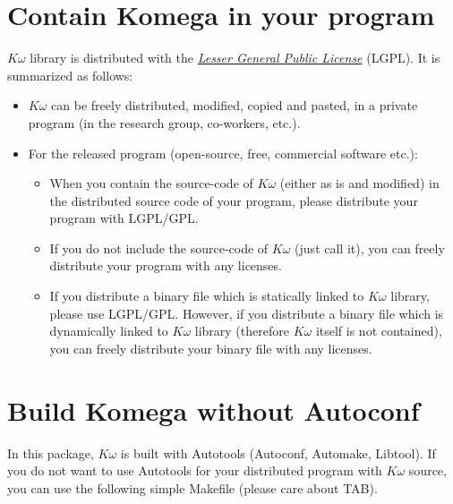 \documentclass[letterpaper,10pt,dvipdfmx,openany]{sphinxmanual}
\begin{document}
\section{Contain Komega in your program}
\label{komega_copyright_en:contain-komega-in-your-program}
\(K\omega\) library is distributed with the {\hyperref[komega_copyright_en:lgplicense]{\emph{Lesser General Public License}}} (LGPL).
It is summarized as follows:
\begin{itemize}
\item {} 
\(K\omega\) can be freely distributed, modified, copied and pasted,
in a private program (in the research group, co-workers, etc.).

\item {} 
For the released program (open-source, free, commercial software etc.):
\begin{itemize}
\item {} 
When you contain the source-code of \(K\omega\) (either as is and modified)
in the distributed source code of your program,
please distribute your program with LGPL/GPL.

\item {} 
If you do not include the source-code of \(K\omega\) (just call it),
you can freely distribute your program with any licenses.

\item {} 
If you distribute a binary file which is statically linked to \(K\omega\) library,
please use LGPL/GPL. However, if you distribute a binary file which is dynamically linked to
\(K\omega\) library (therefore \(K\omega\) itself is not contained),
you can freely distribute your binary file with any licenses.

\end{itemize}

\end{itemize}


\section{Build Komega without Autoconf}
\label{komega_copyright_en:build-komega-without-autoconf}
In this package, \(K\omega\) is built with Autotools (Autoconf, Automake, Libtool).
If you do not want to use Autotools for your distributed program with \(K\omega\) source,
you can use the following simple Makefile (please care about TAB).
\end{document}
